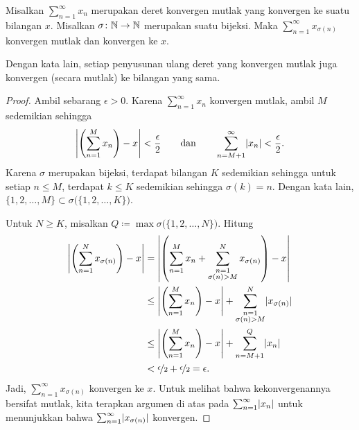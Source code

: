 \begin{prop}
Misalkan $\sum_{n=1}^\infty x_n$ merupakan deret konvergen mutlak yang konvergen ke suatu bilangan
$x$.  Misalkan $\sigma \colon {\mathbb{N}} \to {\mathbb{N}}$ merupakan suatu bijeksi.  Maka
$\sum_{n=1}^\infty x_{\sigma(n)}$ konvergen mutlak dan konvergen ke $x$.
\end{prop}

Dengan kata lain,
setiap penyusunan ulang deret yang konvergen mutlak juga konvergen (secara mutlak)
ke bilangan yang sama.

\begin{proof}
Ambil sebarang $\epsilon > 0$.  Karena $\sum_{n=1}^\infty x_n$ konvergen mutlak, ambil $M$ sedemikian sehingga
\begin{equation*}
\left\lvert {\left(\sum_{n=1}^M x_n \right) - x} \right\rvert < \frac{\epsilon}{2}
\qquad \text{dan} \qquad
\sum_{n=M+1}^\infty \lvert {x_n} \rvert < \frac{\epsilon}{2} .
\end{equation*}
Karena $\sigma$ merupakan bijeksi,
terdapat bilangan $K$ sedemikian sehingga untuk setiap
$n \leq M$, terdapat $k \leq K$ sedemikian sehingga $\sigma(k) = n$.
Dengan kata lain,
$\{ 1,2,\ldots,M \} \subset \sigma\bigl(\{ 1,2,\ldots,K \} \bigr)$.

Untuk $N \geq K$, misalkan $Q \coloneqq \max \sigma\bigl(\{ 1,2,\ldots,N \}\bigr)$.
Hitung
\begin{equation*}
\begin{split}
\left\lvert {\left( \sum_{n=1}^N x_{\sigma(n)} \right) - x} \right\rvert
& =
\left\lvert { \left( \sum_{n=1}^M x_n
+
\sum_{\substack{n=1\\\sigma(n) > M}}^N x_{\sigma(n)} \right) - x} \right\rvert
\\
& \leq
\left\lvert { \left( \sum_{n=1}^M x_n \right) - x} \right\rvert
+
\sum_{\substack{n=1\\\sigma(n) > M}}^N \lvert {x_{\sigma(n)}} \rvert
\\
& \leq
\left\lvert { \left( \sum_{n=1}^M x_n \right) - x} \right\rvert
+
\sum_{n=M+1}^Q \lvert {x_{n}} \rvert
\\
& < \nicefrac{\epsilon}{2} + \nicefrac{\epsilon}{2} = \epsilon .
\end{split}
\end{equation*}
Jadi,
$\sum_{n=1}^\infty x_{\sigma(n)}$ konvergen ke $x$.  Untuk melihat bahwa kekonvergenannya
bersifat mutlak, kita terapkan argumen di atas pada $\sum_{n=1}^\infty \lvert {x_n} \rvert$ untuk menunjukkan
bahwa $\sum_{n=1}^\infty \lvert {x_{\sigma(n)}} \rvert$ konvergen.
\end{proof}

